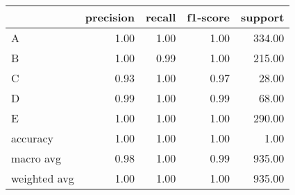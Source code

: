 \begin{tabular}{|l|r|r|r|r|}
\hline
{} &  precision &  recall &  f1-score &  support \\
\hline
A            &       1.00 &    1.00 &      1.00 &   334.00 \\
B            &       1.00 &    0.99 &      1.00 &   215.00 \\
C            &       0.93 &    1.00 &      0.97 &    28.00 \\
D            &       0.99 &    1.00 &      0.99 &    68.00 \\
E            &       1.00 &    1.00 &      1.00 &   290.00 \\
accuracy     &       1.00 &    1.00 &      1.00 &     1.00 \\
macro avg    &       0.98 &    1.00 &      0.99 &   935.00 \\
weighted avg &       1.00 &    1.00 &      1.00 &   935.00 \\
\hline
\end{tabular}
